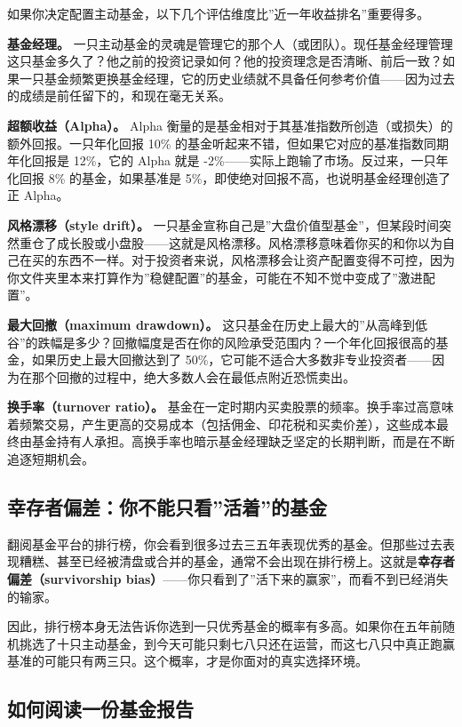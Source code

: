 \documentclass[a4paper,11pt,oneside,fontset=none,UTF8,zihao=-4]{ctexbook}
\begin{document}
如果你决定配置主动基金，以下几个评估维度比''近一年收益排名''重要得多。

\textbf{基金经理。}
一只主动基金的灵魂是管理它的那个人（或团队）。现任基金经理管理这只基金多久了？他之前的投资记录如何？他的投资理念是否清晰、前后一致？如果一只基金频繁更换基金经理，它的历史业绩就不具备任何参考价值------因为过去的成绩是前任留下的，和现在毫无关系。

\textbf{超额收益（Alpha）。} Alpha
衡量的是基金相对于其基准指数所创造（或损失）的额外回报。一只年化回报
10\% 的基金听起来不错，但如果它对应的基准指数同期年化回报是 12\%，它的
Alpha 就是 -2\%------实际上跑输了市场。反过来，一只年化回报 8\%
的基金，如果基准是 5\%，即使绝对回报不高，也说明基金经理创造了正 Alpha。

\textbf{风格漂移（style drift）。}
一只基金宣称自己是''大盘价值型基金''，但某段时间突然重仓了成长股或小盘股------这就是风格漂移。风格漂移意味着你买的和你以为自己在买的东西不一样。对于投资者来说，风格漂移会让资产配置变得不可控，因为你文件夹里本来打算作为''稳健配置''的基金，可能在不知不觉中变成了''激进配置''。

\textbf{最大回撤（maximum drawdown）。}
这只基金在历史上最大的''从高峰到低谷''的跌幅是多少？回撤幅度是否在你的风险承受范围内？一个年化回报很高的基金，如果历史上最大回撤达到了
50\%，它可能不适合大多数非专业投资者------因为在那个回撤的过程中，绝大多数人会在最低点附近恐慌卖出。

\textbf{换手率（turnover ratio）。}
基金在一定时期内买卖股票的频率。换手率过高意味着频繁交易，产生更高的交易成本（包括佣金、印花税和买卖价差），这些成本最终由基金持有人承担。高换手率也暗示基金经理缺乏坚定的长期判断，而是在不断追逐短期机会。

\subsection{幸存者偏差：你不能只看''活着''的基金}\label{ux5e78ux5b58ux8005ux504fux5deeux4f60ux4e0dux80fdux53eaux770bux6d3bux7740ux7684ux57faux91d1}

翻阅基金平台的排行榜，你会看到很多过去三五年表现优秀的基金。但那些过去表现糟糕、甚至已经被清盘或合并的基金，通常不会出现在排行榜上。这就是\textbf{幸存者偏差（survivorship
bias）}------你只看到了''活下来的赢家''，而看不到已经消失的输家。

因此，排行榜本身无法告诉你选到一只优秀基金的概率有多高。如果你在五年前随机挑选了十只主动基金，到今天可能只剩七八只还在运营，而这七八只中真正跑赢基准的可能只有两三只。这个概率，才是你面对的真实选择环境。

\subsection{如何阅读一份基金报告}\label{ux5982ux4f55ux9605ux8bfbux4e00ux4efdux57faux91d1ux62a5ux544a}
\end{document}
